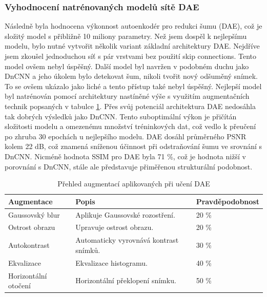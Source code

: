 \documentclass[male,czech,api_ing]{thesis}
\begin{document}
\subsubsection{Vyhodnocení natrénovaných modelů sítě DAE}
Následně byla hodnocena výkonnost autoenkodér pro redukci šumu (DAE), což je složitý model s přibližně 10 miliony parametry. Než jsem dospěl k nejlepšímu modelu, bylo nutné vytvořit několik variant základní architektury DAE. Nejdříve jsem zkoušel jednoduchou síť s pár vrstvami bez použití skip connections. Tento model ovšem nebyl úspěšný. Další model byl navržen v podobném duchu jako DnCNN a jeho úkolem bylo detekovat šum, nikoli tvořit nový odšuměný snímek. To se ovšem ukázalo jako liché a tento přístup také nebyl úspěšný. Nejlepší model byl natrénován pomocí architektury nastíněné výše s využitím augmentačních technik popsaných v tabulce \ref{tab:DAE_augmentation}. Přes svůj potenciál architektura DAE nedosáhla tak dobrých výsledků jako DnCNN. Tento suboptimální výkon je přičítán složitosti modelu a omezenému množství tréninkových dat, což vedlo k přeučení po zhruba 30 epochách u nejlepšího modelu. DAE dosáhl průměrného PSNR kolem 22 dB, což znamená sníženou účinnost při odstraňování šumu ve srovnání s DnCNN. Nicméně hodnota SSIM pro DAE byla 71 \%, což je hodnota nižší v porovnání s DnCNN, stále ale představuje přiměřenou strukturální podobnost.

\begin{table}[h]
    \centering
    \begin{tabular}{|l|l|l|}
    \hline
    \textbf{Augmentace}  & \textbf{Popis}                            & \textbf{Pravděpodobnost}   \\ \hline
    Gaussovský blur      & Aplikuje Gaussovské rozostření.           &  20 \%                     \\ \hline
    Ostrost obrazu       & Upravuje ostrost obrazu.                  &  20 \%                     \\ \hline
    Autokontrast         & Automaticky vyrovnává kontrast snímků.    &  30 \%                     \\ \hline
    Ekvalizace           & Ekvalizace histogramu.                    &  40 \%                     \\ \hline
    Horizontální otočení & Horizontální překlopení snímku.           &  50 \%                     \\ \hline
    \end{tabular}
    \caption{Přehled augmentací aplikovaných při učení DAE}
    \label{tab:DAE_augmentation}
\end{table}
\end{document}
